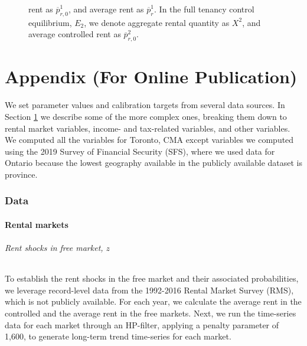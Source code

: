 \documentclass[parskip=full]{article}
\newenvironment{fignote2}[1]
{
\par
\medskip
\begin{minipage}{#1}
\footnotesize
}
{
\end{minipage}
}
\begin{document}
\begin{figure}[H]
\begin{fignote2}{1.0\textwidth}
rent as $\overline{p}^{1}_{r,0}$, and average rent as $\overline{p}^{1}_{r}$. In the full tenancy control equilibrium, $E_{2}$, we denote aggregate rental quantity as $X^{2}$, and average controlled rent as $\overline{p}^{2}_{r,0}$.  
    \end{fignote2}
\end{figure}
    
\newpage

\appendix

\maketitle


\part*{Appendix (For Online Publication)}

We set parameter values and calibration targets from several data sources. In Section \ref{appendix:data} we describe some of the more complex ones, breaking them down to rental market variables, income- and tax-related variables, and other variables. We computed all the variables for Toronto, CMA except variables we computed using the 2019 Survey of Financial Security (SFS), where we used data for Ontario because the lowest geography available in the publicly available dataset is province.

\section{Data}\label{appendix:data}

\subsection{Rental markets}

\paragraph{Rent shocks in free market, $z$}

To establish the rent shocks in the free market and their associated probabilities, we leverage record-level data from the 1992-2016 Rental Market Survey (RMS), which is not publicly available. For each year, we calculate the average rent in the controlled and the average rent in the free markets. Next, we run the time-series data for each market through an HP-filter, applying a penalty parameter of 1,600, to generate long-term trend time-series for each market.
\end{document}
